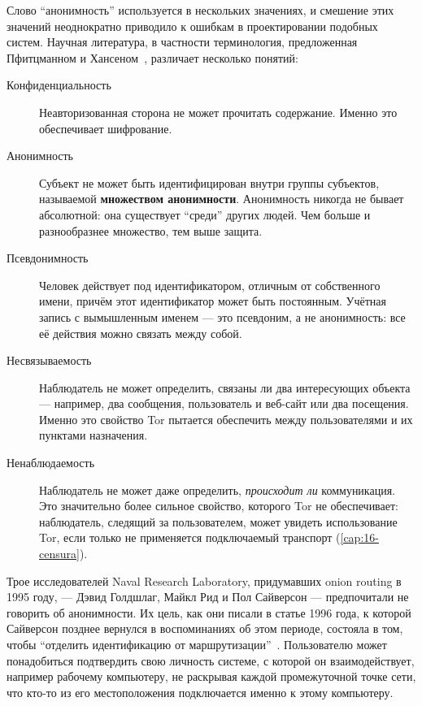 Слово \enquote{анонимность} используется в нескольких значениях, и смешение этих значений неоднократно приводило к ошибкам в проектировании подобных систем. Научная литература, в частности терминология, предложенная Пфитцманном и Хансеном~\cite{pfitzmann2010terminology}, различает несколько понятий:
\begin{description}
  \item[Конфиденциальность] Неавторизованная сторона не может прочитать содержание. Именно это обеспечивает шифрование.
  \item[Анонимность] Субъект не может быть идентифицирован внутри группы субъектов, называемой \textbf{множеством анонимности}. Анонимность никогда не бывает абсолютной: она существует \enquote{среди} других людей. Чем больше и разнообразнее множество, тем выше защита.
  \item[Псевдонимность] Человек действует под идентификатором, отличным от собственного имени, причём этот идентификатор может быть постоянным. Учётная запись с вымышленным именем --- это псевдоним, а не анонимность: все её действия можно связать между собой.
  \item[Несвязываемость] Наблюдатель не может определить, связаны ли два интересующих объекта --- например, два сообщения, пользователь и веб-сайт или два посещения. Именно это свойство Tor пытается обеспечить между пользователями и их пунктами назначения.
  \item[Ненаблюдаемость] Наблюдатель не может даже определить, \emph{происходит ли} коммуникация. Это значительно более сильное свойство, которого Tor не обеспечивает: наблюдатель, следящий за пользователем, может увидеть использование Tor, если только не применяется подключаемый транспорт (\cref{cap:16-censura}).
\end{description}

\begin{storia}
Трое исследователей Naval Research Laboratory, придумавших onion routing в 1995 году, --- Дэвид Голдшлаг, Майкл Рид и Пол Сайверсон --- предпочитали не говорить об анонимности. Их цель, как они писали в статье 1996 года, к которой Сайверсон позднее вернулся в воспоминаниях об этом периоде, состояла в том, чтобы \enquote{отделить идентификацию от маршрутизации}~\cite{syverson2011peel}. Пользователю может понадобиться подтвердить свою личность системе, с которой он взаимодействует, например рабочему компьютеру, не раскрывая каждой промежуточной точке сети, что кто-то из его местоположения подключается именно к этому компьютеру.
\end{storia}

